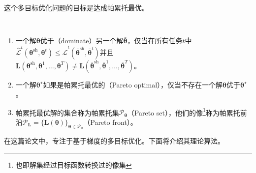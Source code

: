 \documentclass{ctexart}
\begin{document}
这个多目标优化问题的目标是达成帕累托最优。

\begin{definition}[MTL中的帕累托最优] {\ }%
    \normalfont
    \begin{enumerate}[topsep=0pt, label=(\alph*),align=left,leftmargin=*]
    \item 一个解$\bm\theta$优于（dominate）另一个解$\bar{\bm\theta}$，仅当在所有任务$t$中\mbox{$\hat{\mathcal{L}}^t(\bm\theta^\mathrm{sh},\bm\theta^t)  \leq \hat{\mathcal{L}}^t(\bar{\bm\theta}^\mathrm{sh},\bar{\bm\theta}^t)$}并且 \\ \mbox{$\mathbf{L}(\bm\theta^\mathrm{sh}, \bm\theta^1,\ldots,\bm\theta^T) \neq \mathbf{L}(\bar{\bm\theta}^\mathrm{sh}, \bar{\bm\theta}^1,\ldots,\bar{\bm\theta}^T) $}。
    \item 一个解$\bm\theta^\star$如果是帕累托最优的（Pareto optimal），仅当不存在一个解$\bm\theta$优于$\bm\theta^\star$。
    \item 帕累托最优解的集合称为帕累托集$\mathcal{P}_{\bm\theta}$（Pareto set），他们的像\footnote{也即解集经过目标函数转换过的像集}称为帕累托前沿$\mathcal{P}_{\mathbf{L}}=\{\mathbf{L}(\bm\theta)\}_{\bm\theta\in \mathcal{P}_{\bm\theta}}$（Pareto front）。
    \end{enumerate}
\end{definition}

在这篇论文中，\citet{Sener18Pareto}专注于基于梯度的多目标优化。下面将介绍其理论算法。
\end{document}
